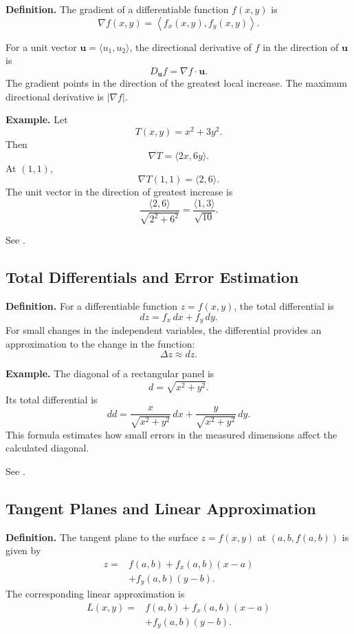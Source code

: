 \documentclass[a4paper,12pt]{article}
\theoremstyle{mystyle}
\numberwithin{equation}{section}
\numberwithin{theorem}{section}
\numberwithin{proposition}{section}
\numberwithin{example}{section}
\numberwithin{remark}{section}
\numberwithin{lemma}{section}
\numberwithin{corollary}{section}
\numberwithin{definition}{section}
\begin{document}
\textbf{Definition.}
The gradient of a differentiable function $f(x,y)$ is
\[
    \nabla f(x,y)=
    \left\langle f_x(x,y),f_y(x,y)\right\rangle.
\]

For a unit vector $\mathbf{u}=\langle u_1,u_2\rangle$, the directional
derivative of $f$ in the direction of $\mathbf{u}$ is
\[
    D_{\mathbf{u}}f=\nabla f\cdot\mathbf{u}.
\]
The gradient points in the direction of the greatest local increase.
The maximum directional derivative is $|\nabla f|$.

\textbf{Example.}
Let
\[
    T(x,y)=x^2+3y^2.
\]
Then
\[
    \nabla T=\langle 2x,6y\rangle.
\]
At $(1,1)$,
\[
    \nabla T(1,1)=\langle2,6\rangle.
\]
The unit vector in the direction of greatest increase is
\[
    \frac{\langle2,6\rangle}{\sqrt{2^2+6^2}}
    =\frac{\langle1,3\rangle}{\sqrt{10}}.
\]

See \cite[Section~4.6]{openstaxgradient}.

\subsection{Total Differentials and Error Estimation}

\textbf{Definition.}
For a differentiable function $z=f(x,y)$, the total differential is
\[
    dz=f_x\,dx+f_y\,dy.
\]
For small changes in the independent variables, the differential
provides an approximation to the change in the function:
\[
    \Delta z\approx dz.
\]

\textbf{Example.}
The diagonal of a rectangular panel is
\[
    d=\sqrt{x^2+y^2}.
\]
Its total differential is
\[
    dd=\frac{x}{\sqrt{x^2+y^2}}\,dx
       +\frac{y}{\sqrt{x^2+y^2}}\,dy.
\]
This formula estimates how small errors in the measured dimensions
affect the calculated diagonal.

See \cite[Section~4.4]{openstaxtangent}.

\subsection{Tangent Planes and Linear Approximation}

\textbf{Definition.}
The tangent plane to the surface $z=f(x,y)$ at
$(a,b,f(a,b))$ is given by
\[
\begin{aligned}
    z={}&f(a,b)+f_x(a,b)(x-a)\\
       &+f_y(a,b)(y-b).
\end{aligned}
\]
The corresponding linear approximation is
\[
\begin{aligned}
    L(x,y)={}&f(a,b)+f_x(a,b)(x-a)\\
             &+f_y(a,b)(y-b).
\end{aligned}
\]
\end{document}
